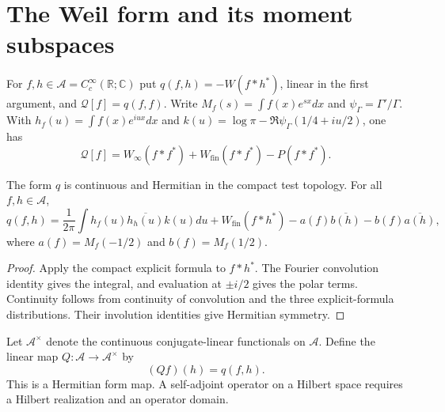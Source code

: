 \section{The Weil form and its moment subspaces}
\label{v4-arith:w7-h:quadratic-form}
\label{v4-arith:w7-h:quadratic-form:weil-as-q}
\begin{definition}
\label{v4-arith:w7-h:def:weil-quadratic}
For $f,h\in\mathscr A=C_c^\infty(\mathbb R;\mathbb C)$ put
$q(f,h)=-W(f*h^*)$, linear in the first argument, and
$\mathcal Q[f]=q(f,f)$.
Write $M_f(s)=\int f(x)e^{sx}dx$ and $\psi_\Gamma=\Gamma'/\Gamma$.
With $h_f(u)=\int f(x)e^{iux}dx$ and
$k(u)=\log\pi-\Re\psi_\Gamma(1/4+iu/2)$, one has
\begin{equation}
\label{v4-arith:w7-h:eq:weil-quadratic}
 \mathcal Q[f]=W_\infty(f*f^*)+W_{\mathrm{fin}}(f*f^*)-P(f*f^*).
\end{equation}
\end{definition}
\begin{proposition}
\label{v4-arith:w7-h:prop:integral-rep}
The form $q$ is continuous and Hermitian in the compact test topology.
For all $f,h\in\mathscr A$,
\begin{equation}
\label{v4-arith:w7-h:eq:integral-rep}
 q(f,h)=\frac1{2\pi}\int h_f(u)\overline{h_h(u)}k(u)du
       +W_{\mathrm{fin}}(f*h^*)
       -a(f)\overline{b(h)}-b(f)\overline{a(h)},
\end{equation}
where $a(f)=M_f(-1/2)$ and $b(f)=M_f(1/2)$.
\end{proposition}
\begin{proof}
Apply the compact explicit formula to $f*h^*$.
The Fourier convolution identity gives the integral, and evaluation
at $\pm i/2$ gives the polar terms.
Continuity follows from continuity of convolution and the three
explicit-formula distributions. Their involution identities give
Hermitian symmetry.
\end{proof}
\label{v4-arith:w7-h:quadratic-form:operator}
\begin{definition}
\label{v4-arith:w7-h:def:Q-operator}
Let $\mathscr A^\times$ denote the continuous conjugate-linear
functionals on $\mathscr A$. Define the linear map
$Q:\mathscr A\to\mathscr A^\times$ by
\begin{equation}
\label{v4-arith:w7-h:eq:Q-operator}
 (Qf)(h)=q(f,h).
\end{equation}
This is a Hermitian form map. A self-adjoint operator on a Hilbert
space requires a Hilbert realization and an operator domain.
\end{definition}

